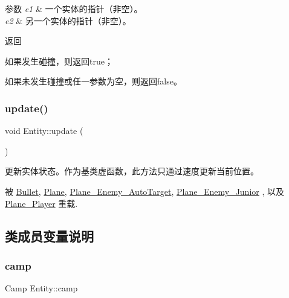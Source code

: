 \begin{DoxyParams}{参数}
{\em e1} & 一个实体的指针（非空）。\\
\hline
{\em e2} & 另一个实体的指针（非空）。 \\
\hline
\end{DoxyParams}
\begin{DoxyReturn}{返回}

\begin{DoxyItemize}
\item 如果发生碰撞，则返回true；
\item 如果未发生碰撞或任一参数为空，则返回false。 
\end{DoxyItemize}
\end{DoxyReturn}
\mbox{\label{class_entity_a00b6eeaf99b35c8f8b10b5fbfc1baf4f}} 
\subsubsection{\texorpdfstring{update()}{update()}}
{\footnotesize\ttfamily void Entity\+::update (\begin{DoxyParamCaption}{ }\end{DoxyParamCaption})\hspace{0.3cm}{\ttfamily [virtual]}}



更新实体状态。作为基类虚函数，此方法只通过速度更新当前位置。 



被 \hyperlink{class_bullet_a32f4a0611fe2dd245fee955d14ca1f68}{Bullet}, \hyperlink{class_plane_a7fbb07f76503fe057772e01f542afc32}{Plane}, \hyperlink{class_plane___enemy___auto_target_acae2a6f38bdc71d17188e2b7711f4d5b}{Plane\+\_\+\+Enemy\+\_\+\+Auto\+Target}, \hyperlink{class_plane___enemy___junior_a686e46c9927793dd07235cac72d52405}{Plane\+\_\+\+Enemy\+\_\+\+Junior} , 以及 \hyperlink{class_plane___player_ae68c08ce11fad9fd164c00eb4db6b348}{Plane\+\_\+\+Player} 重载.



\subsection{类成员变量说明}
\mbox{\label{class_entity_a5326accd49d3817310ec90692b9da3df}} 
\subsubsection{\texorpdfstring{camp}{camp}}
{\footnotesize\ttfamily Camp Entity\+::camp\hspace{0.3cm}{\ttfamily [protected]}}



